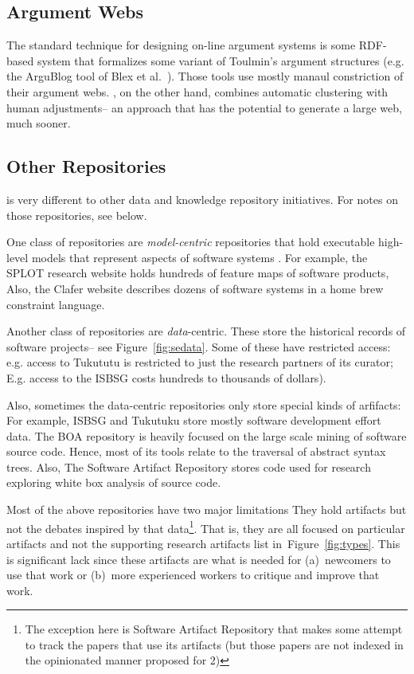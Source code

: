 \documentclass[journal]{IEEEtran}
\newcommand{\fig}[1]{Figure~\ref{fig:#1}}
\begin{document}
\subsection{Argument Webs}

 

The standard technique for designing on-line argument systems is some 
   RDF-based system that formalizes some variant of Toulmin's argument structures
   (e.g. the ArguBlog tool of Blex et al.~\cite{Bex20149}). Those tools use mostly
   manaul constriction of their argument webs. {\IT}, on the other hand, combines
   automatic clustering with human adjustments-- an approach that has the potential to generate a large web, much sooner.
 
 
 

\subsection{Other Repositories}
{\IT} is very different to  other data and knowledge repository initiatives.
For notes on those repositories, see below. 




One class of repositories are {\em model-centric} repositories that hold
executable high-level models that represent aspects of software systems .
For example, 
the SPLOT research website holds hundreds of feature maps of software products,
Also,
the Clafer website describes dozens of software systems in a home brew constraint language.

Another class of repositories are  {\em data}-centric. These store the historical records
of software projects-- see \fig{sedata}.
Some of these have restricted access:
e.g. access to Tukututu is restricted to just the research partners of its
curator; 
E.g. access to the ISBSG costs hundreds
to thousands of dollars). 

Also, sometimes the data-centric repositories only store special kinds of arfifacts:
For example, ISBSG and Tukutuku store mostly 
software development  effort data.  
The BOA repository is heavily focused on the large scale mining of software source code. Hence, most
of its tools relate to the traversal of abstract syntax trees.
Also,
The Software Artifact Repository stores code
used for research exploring white box analysis of source code. 


Most of the above repositories have two major limitations
They hold artifacts  but not
the debates inspired by that data\footnote{The exception here is Software Artifact Repository  that makes
some attempt to track the papers that use its artifacts (but those papers are not indexed
in the opinionated manner proposed for {\IT}2)}.
That is,
they are all  focused on particular artifacts and not the supporting research artifacts list in~\fig{types}.
This is significant lack since these artifacts are what is needed
for (a)~newcomers to use that work or (b)~more experienced workers to critique and improve that work.


\end{document}
